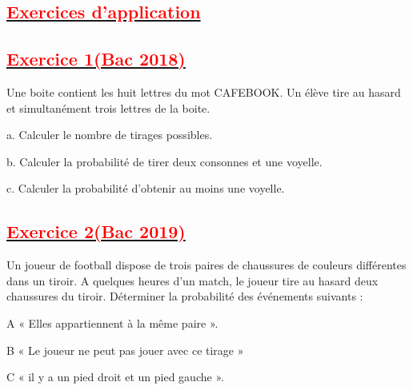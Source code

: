\documentclass[12pt]{article}
\begin{document}
\subsection*{\underline{\textbf{\textcolor{red}{Exercices d’application}}}}
\subsection*{\underline{\textbf{\textcolor{red}{Exercice 1(Bac 2018)}}}}
Une boite contient les huit lettres du mot CAFEBOOK. Un élève tire au hasard et simultanément 
trois lettres de la boite.

a. Calculer le nombre de tirages possibles.

b. Calculer la probabilité de tirer deux consonnes et une voyelle.

c. Calculer la probabilité d’obtenir au moins une voyelle.
\subsection*{\underline{\textbf{\textcolor{red}{Exercice 2(Bac 2019)}}}}
Un joueur de football dispose de trois paires de chaussures de couleurs différentes dans un tiroir. 
A quelques heures d’un match, le joueur tire au hasard deux chaussures du tiroir. Déterminer la 
probabilité des événements suivants :

A «  Elles appartiennent à la même paire ».

B «  Le joueur ne peut pas jouer avec ce tirage »

C «  il y a un pied droit et un pied gauche ».
\end{document}

